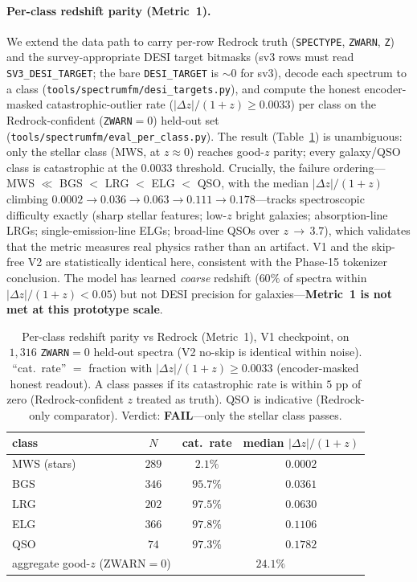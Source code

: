 \documentclass[11pt,letterpaper]{article}
\begin{document}
\paragraph{Per-class redshift parity (Metric~1).}
We extend the data path to carry per-row Redrock truth (\texttt{SPECTYPE},
\texttt{ZWARN}, \texttt{Z}) and the survey-appropriate DESI target bitmasks
(sv3 rows must read \texttt{SV3\_DESI\_TARGET}; the bare \texttt{DESI\_TARGET}
is ${\sim}0$ for sv3), decode each spectrum to a class
(\texttt{tools/spectrumfm/desi\_targets.py}), and compute the
honest encoder-masked catastrophic-outlier rate ($|\Delta z|/(1{+}z) \ge
0.0033$) per class on the Redrock-confident (\texttt{ZWARN}${=}0$) held-out set
(\texttt{tools/spectrumfm/eval\_per\_class.py}). The result
(Table~\ref{tab:perclass}) is unambiguous: only the stellar class (MWS, at
$z{\approx}0$) reaches good-$z$ parity; every galaxy/QSO class is catastrophic
at the $0.0033$ threshold. Crucially, the failure ordering---MWS $\ll$ BGS $<$
LRG $<$ ELG $<$ QSO, with the median $|\Delta z|/(1{+}z)$ climbing $0.0002 \to
0.036 \to 0.063 \to 0.111 \to 0.178$---tracks spectroscopic difficulty exactly
(sharp stellar features; low-$z$ bright galaxies; absorption-line LRGs;
single-emission-line ELGs; broad-line QSOs over $z\,{\to}\,3.7$), which
validates that the metric measures real physics rather than an artifact. V1 and
the skip-free V2 are statistically identical here, consistent with the
Phase-15 tokenizer conclusion. The model has learned \emph{coarse} redshift
($60\%$ of spectra within $|\Delta z|/(1{+}z) < 0.05$) but not DESI precision
for galaxies---\textbf{Metric~1 is not met at this prototype scale}.

\begin{table}[t]
\centering
\caption{Per-class redshift parity vs Redrock (Metric~1), V1 checkpoint, on
$1{,}316$ \texttt{ZWARN}${=}0$ held-out spectra (V2 no-skip is identical within
noise). ``cat.\ rate'' $= $ fraction with $|\Delta z|/(1{+}z) \ge 0.0033$
(encoder-masked honest readout). A class passes if its catastrophic rate is
within $5$ pp of zero (Redrock-confident $z$ treated as truth). QSO is
indicative (Redrock-only comparator). Verdict: \textbf{FAIL}---only the stellar
class passes.}
\label{tab:perclass}
\begin{tabular}{lccc}
\toprule
class & $N$ & cat.\ rate & median $|\Delta z|/(1{+}z)$ \\
\midrule
MWS (stars) & $289$ & $2.1\%$  & $0.0002$ \\
BGS         & $346$ & $95.7\%$ & $0.0361$ \\
LRG         & $202$ & $97.5\%$ & $0.0630$ \\
ELG         & $366$ & $97.8\%$ & $0.1106$ \\
QSO         & $74$  & $97.3\%$ & $0.1782$ \\
\midrule
\multicolumn{2}{l}{aggregate good-$z$ (ZWARN${=}0$)} & \multicolumn{2}{c}{$24.1\%$} \\
\bottomrule
\end{tabular}
\end{table}
\end{document}
